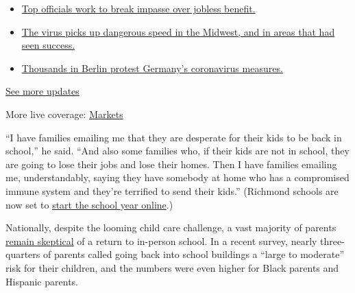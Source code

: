\begin{itemize}
\tightlist
\item
  \href{https://www.nytimes3xbfgragh.onion/2020/08/01/world/coronavirus-covid-19.html?action=click\&pgtype=Article\&state=default\&region=MAIN_CONTENT_1\&context=storylines_live_updates\#link-3ac56579}{Top
  officials work to break impasse over jobless benefit.}
\item
  \href{https://www.nytimes3xbfgragh.onion/2020/08/01/world/coronavirus-covid-19.html?action=click\&pgtype=Article\&state=default\&region=MAIN_CONTENT_1\&context=storylines_live_updates\#link-8796723}{The
  virus picks up dangerous speed in the Midwest, and in areas that had
  seen success.}
\item
  \href{https://www.nytimes3xbfgragh.onion/2020/08/01/world/coronavirus-covid-19.html?action=click\&pgtype=Article\&state=default\&region=MAIN_CONTENT_1\&context=storylines_live_updates\#link-25930521}{Thousands
  in Berlin protest Germany's coronavirus measures.}
\end{itemize}

\href{https://www.nytimes3xbfgragh.onion/2020/08/01/world/coronavirus-covid-19.html?action=click\&pgtype=Article\&state=default\&region=MAIN_CONTENT_1\&context=storylines_live_updates}{See
more updates}

More live coverage:
\href{https://www.nytimes3xbfgragh.onion/live/2020/07/31/business/stock-market-today-coronavirus?action=click\&pgtype=Article\&state=default\&region=MAIN_CONTENT_1\&context=storylines_live_updates}{Markets}

``I have families emailing me that they are desperate for their kids to
be back in school,'' he said. ``And also some families who, if their
kids are not in school, they are going to lose their jobs and lose their
homes. Then I have families emailing me, understandably, saying they
have somebody at home who has a compromised immune system and they're
terrified to send their kids.'' (Richmond schools are now set to
\href{https://richmond.com/news/local/richmond-public-schools-will-have-fully-virtual-learning-in-the-fall-because-of-covid-19/article_bcfe040f-7aa5-5c5b-b93a-feeeee56291e.html}{start
the school year online}.)

Nationally, despite the looming child care challenge, a vast majority of
parents
\href{https://www.chalkbeat.org/2020/7/14/21324873/school-closure-reopening-parents-surveys}{remain
skeptical} of a return to in-person school. In a recent survey, nearly
three-quarters of parents called going back into school buildings a
``large to moderate'' risk for their children, and the numbers were even
higher for Black parents and Hispanic parents.

